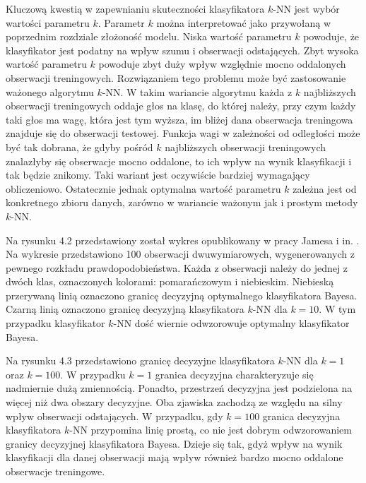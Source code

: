 \documentclass[notitlepage]{report}
\begin{document}
Kluczową kwestią w zapewnianiu skuteczności klasyfikatora $k$-NN jest wybór wartości parametru $k$. Parametr $k$ można interpretować jako przywołaną w poprzednim rozdziale złożoność modelu. Niska wartość parametru $k$ powoduje, że klasyfikator jest podatny na wpływ szumu i obserwacji odstających. Zbyt wysoka wartość parametru $k$ powoduje zbyt duży wpływ względnie mocno oddalonych obserwacji treningowych. Rozwiązaniem tego problemu może być zastosowanie ważonego algorytmu $k$-NN. W takim wariancie algorytmu każda z $k$ najbliższych obserwacji treningowych oddaje głos na klasę, do której należy, przy czym każdy taki głos ma wagę, która jest tym wyższa, im bliżej dana obserwacja treningowa znajduje się do obserwacji testowej. Funkcja wagi w zależności od odległości może być tak dobrana, że gdyby pośród $k$ najbliższych obserwacji treningowych znalazłyby się obserwacje mocno oddalone, to ich wpływ na wynik klasyfikacji i tak będzie znikomy. Taki wariant jest oczywiście bardziej wymagający obliczeniowo. Ostatecznie jednak optymalna wartość parametru $k$ zależna jest od konkretnego zbioru danych, zarówno w wariancie ważonym jak i prostym metody $k$-NN.

Na rysunku 4.2 przedstawiony został wykres opublikowany w pracy Jamesa i in. \cite{islr}. Na wykresie przedstawiono 100 obserwacji dwuwymiarowych, wygenerowanych z pewnego rozkładu prawdopodobieństwa. Każda z obserwacji należy do jednej z dwóch klas, oznaczonych kolorami: pomarańczowym i niebieskim. Niebieską przerywaną linią oznaczono granicę decyzyjną optymalnego klasyfikatora Bayesa. Czarną linią oznaczono granicę decyzyjną klasyfikatora $k$-NN dla $k=10$. W tym przypadku klasyfikator $k$-NN dość wiernie odwzorowuje optymalny klasyfikator Bayesa.

Na rysunku 4.3 przedstawiono granicę decyzyjne klasyfikatora $k$-NN dla $k=1$ oraz $k=100$. W przypadku $k=1$ granica decyzyjna charakteryzuje się nadmiernie dużą zmiennością. Ponadto, przestrzeń decyzyjna jest podzielona na więcej niż dwa obszary decyzyjne. Oba zjawiska zachodzą ze względu na silny wpływ obserwacji odstających. W przypadku, gdy $k=100$ granica decyzyjna klasyfikatora $k$-NN przypomina linię prostą, co nie jest dobrym odwzorowaniem granicy decyzyjnej klasyfikatora Bayesa. Dzieje się tak, gdyż wpływ na wynik klasyfikacji dla danej obserwacji mają wpływ również bardzo mocno oddalone obserwacje treningowe.
\end{document}
